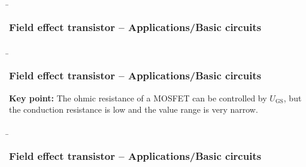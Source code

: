 \begin{frame}
    \b{ \frametitle{Field effect transistor -- Applications/Basic circuits}
        \begin{figure}[H]
            \centering
            \begin{minipage}[c]{.48\textwidth}
                \centering
                
            \end{minipage}
            \begin{minipage}[c]{.48\textwidth}
                \centering
                
            \end{minipage}
        
        \end{figure}
    }
\end{frame}

\begin{frame}
    \b{\frametitle{Field effect transistor -- Applications/Basic circuits}
        \textbf{Key point:}
        The ohmic resistance of a MOSFET can be controlled by $U_\mathrm{GS}$, 
        but the conduction resistance is low and the value range is very narrow.  
        }
\end{frame}

\begin{frame}
    \b{ \frametitle{Field effect transistor -- Applications/Basic circuits}
        \begin{figure}[H]
            \centering
            \begin{minipage}[c]{.48\textwidth}
                \centering
                
            \end{minipage}
            \begin{minipage}[c]{.48\textwidth}
                \centering
                
            \end{minipage}
        
        \end{figure}
    }
\end{frame}

